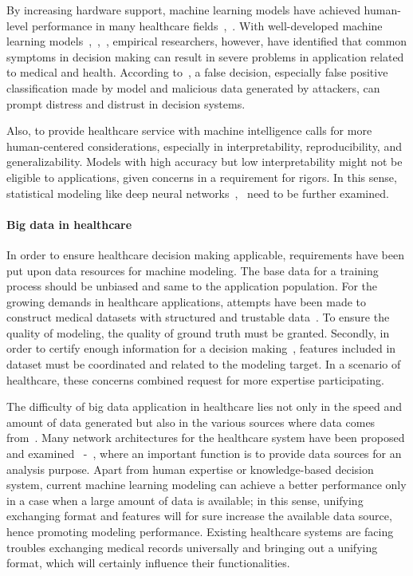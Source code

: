 \documentclass[letterpaper, twocolumn, 10pt, conference]{IEEEtran}
\begin{document}
By increasing hardware support, machine learning models have achieved human-level performance in many healthcare fields~\cite{hc_paper_6},~\cite{hc_paper_10}. With well-developed machine learning models~\cite{hc_paper_24},~\cite{hc_paper_25},~\cite{hc_paper_26}, empirical researchers, however, have identified that common symptoms in decision making can result in severe problems in application related to medical and health. According to~\cite{hc_paper_7,hc_paper_10,hc_book_9}, a false decision, especially false positive classification made by model and malicious data generated by attackers, can prompt distress and distrust in decision systems.


Also, to provide healthcare service with machine intelligence calls for more human-centered considerations, especially in interpretability, reproducibility, and generalizability. Models with high accuracy but low interpretability might not be eligible to applications, given concerns in a requirement for rigors. In this sense, statistical modeling like deep neural networks~\cite{hc_paper_24},~\cite{hc_book_9} need to be further examined.


\paragraph{Big data in healthcare}


In order to ensure healthcare decision making applicable, requirements have been put upon data resources for machine modeling. The base data for a training process should be unbiased and same to the application population. For the growing demands in healthcare applications, attempts have been made to construct medical datasets with structured and trustable data~\cite{hc_dataset_uci}. To ensure the quality of modeling, the quality of ground truth must be granted. Secondly, in order to certify enough information for a decision making~\cite{hc_paper_27}, features included in dataset must be coordinated and related to the modeling target. In a scenario of healthcare, these concerns combined request for more expertise participating.


The difficulty of big data application in healthcare lies not only in the speed and amount of data generated but also in the various sources where data comes from~\cite{hc_paper_28}. Many network architectures for the healthcare system have been proposed and examined~\cite{hc_patent_11} -~\cite{hc_paper_14}, where an important function is to provide data sources for an analysis purpose. Apart from human expertise or knowledge-based decision system, current machine learning modeling can achieve a better performance only in a case when a large amount of data is available; in this sense, unifying exchanging format and features will for sure increase the available data source, hence promoting modeling performance. Existing healthcare systems are facing troubles exchanging medical records universally and bringing out a unifying format, which will certainly influence their functionalities.
\end{document}
